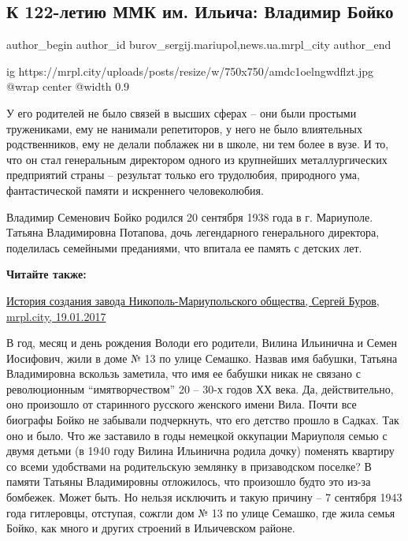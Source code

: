  
 
 
 
 
 
\subsection{К 122-летию ММК им. Ильича: Владимир Бойко}
\label{sec:02_02_2019.stz.news.ua.mrpl_city.1.k_122_letiu_mkk_im_iljicha_vladimir_bojko}
 
\ifcmt
 author_begin
   author_id burov_sergij.mariupol,news.ua.mrpl_city
 author_end
\fi

\ifcmt
  ig https://mrpl.city/uploads/posts/resize/w/750x750/amdc1oelngwdflzt.jpg
  @wrap center
  @width 0.9
\fi

У его родителей не было связей в высших сферах – они были простыми тружениками,
ему не нанимали репетиторов, у него не было влиятельных родственников, ему не
делали поблажек ни в школе, ни тем более в вузе. И то, что он стал генеральным
директором одного из крупнейших металлургических предприятий страны – результат
только его трудолюбия, природного ума, фантастической памяти и искреннего
человеколюбия.

Владимир Семенович Бойко родился 20 сентября 1938 года в г. Мариуполе. Татьяна
Владимировна Потапова, дочь легендарного генерального директора, поделилась
семейными преданиями, что впитала ее память с детских лет.

\textbf{Читайте также:} 

\href{https://archive.org/details/19_01_2017.sergij_burov.mrpl_city.istoria_sozdania_zavoda_nikopol_mariupol_obschestva}{%
История создания завода Никополь-Мариупольского общества, Сергей Буров, mrpl.city, 19.01.2017}

В год, месяц и день рождения Володи его родители, Вилина Ильинична и Семен
Иосифович, жили в доме № 13 по улице Семашко. Назвав имя бабушки, Татьяна
Владимировна вскользь заметила, что имя ее бабушки никак не связано с
революционным \enquote{имятворчеством} 20 – 30-х годов ХХ века. Да, действительно, оно
произошло от старинного русского  женского имени Вила. Почти все биографы Бойко
не забывали подчеркнуть, что его детство прошло в Садках. Так оно и было. Что
же заставило в годы немецкой оккупации Мариуполя семью с двумя детьми (в 1940
году Вилина Ильинична родила дочку)  поменять квартиру со всеми удобствами на
родительскую землянку в призаводском поселке? В памяти Татьяны Владимировны
отложилось, что произошло будто это из-за бомбежек. Может быть. Но нельзя
исключить и такую причину – 7 сентября 1943 года гитлеровцы, отступая, сожгли
дом № 13 по улице Семашко, где жила семья Бойко, как много и других строений в
Ильичевском районе.

